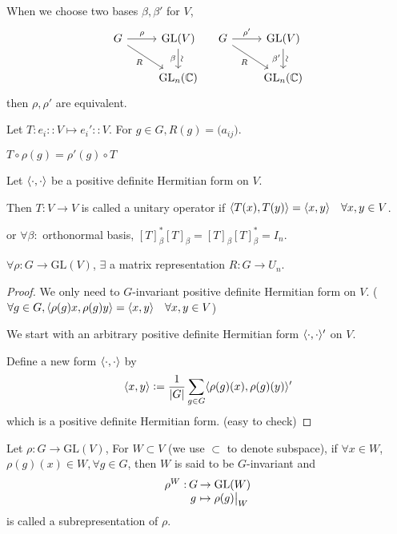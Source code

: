 \begin{remark}
  When we choose two bases $\beta, \beta'$ for $V$,
  \[
    \begin{tikzcd}
      G \arrow{r}{\rho} \arrow[swap]{dr}{R} & \text{GL}(V) \arrow[d, "\beta"', "\rotatebox{90}{\(\sim\)}"] \\
                                            & \text{GL}_n(\Cb)
    \end{tikzcd} \quad
    \begin{tikzcd}
      G \arrow{r}{\rho'} \arrow[swap]{dr}{R} & \text{GL}(V) \arrow[d, "\beta'"', "\rotatebox{90}{\(\sim\)}"] \\
                                            & \text{GL}_n(\Cb)
    \end{tikzcd}
  \]
  then $\rho, \rho'$ are equivalent.
\end{remark}

Let $T: e_i :: V \mapsto e_i' :: V$. For $g \in G, R(g) = \big(a_{ij}\big)$.

$T \circ \rho(g) = \rho'(g) \circ T$

\begin{definition}
  Let $\langle\cdot, \cdot\rangle$ be a positive definite Hermitian form on $V$.

  Then $T: V \to V$ is called a unitary operator if
  $\langle T(x), T(y)\rangle = \langle x, y\rangle \quad \forall x, y \in V$.

  or $\forall \beta:$ orthonormal basis,
  $[T]_\beta^*[T]_\beta = [T]_\beta[T]_\beta^* = I_n$.
\end{definition}

\begin{theorem}
  $\forall \rho: G \to \text{GL}(V)$, $\exists$ a matrix representation
  $R: G \to U_n$.
  \begin{proof}
    We only need to $G$-invariant positive definite Hermitian form on $V$.
    ($\forall g \in G, \langle\rho(g)x, \rho(g)y\rangle = \langle x, y\rangle \quad
  \forall x, y \in V$)

  We start with an arbitrary positive definite Hermitian form
  $\langle\cdot, \cdot\rangle'$ on $V$.

  Define a new form $\langle\cdot, \cdot\rangle$ by
  \[
    \langle x, y\rangle \vcentcolon= \frac{1}{\lvert G\rvert} \sum_{g\in G}
    \langle\rho(g)(x), \rho(g)(y)\rangle'
  \]
  which is a positive definite Hermitian form. (easy to check)
  \end{proof}
\end{theorem}

\begin{definition}
  Let $\rho: G \to \text{GL}(V)$, For $W \subset V$ (we use $\subset$ to denote
  subspace), if $\forall x \in W$, $\rho(g)(x) \in W, \forall g \in G$, then
  $W$ is said to be $G$-invariant and
  \[
    \arraycolsep=1pt
    \begin{array}{rcl}
      \rho^W: & G & \to \text{GL}(W) \\
              & g & \mapsto \rho(g) \big|_W
    \end{array}
  \]
  is called a subrepresentation of $\rho$.
\end{definition}

